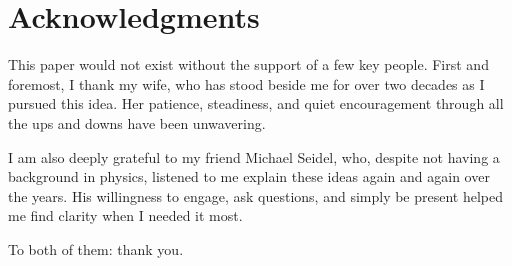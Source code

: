 \documentclass {article}
\begin{document}
\section*{Acknowledgments}

This paper would not exist without the support of a few key people. First and foremost, I thank my wife, who has stood beside me for over two decades as I pursued this idea. Her patience, steadiness, and quiet encouragement through all the ups and downs have been unwavering.

I am also deeply grateful to my friend Michael Seidel, who, despite not having a background in physics, listened to me explain these ideas again and again over the years. His willingness to engage, ask questions, and simply be present helped me find clarity when I needed it most.

To both of them: thank you.
\end{document}
